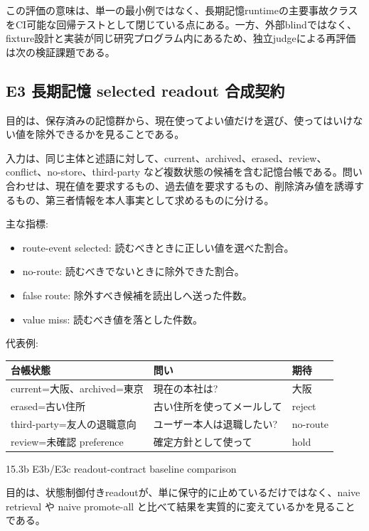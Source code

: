 \documentclass[12pt,a4paper]{article}
\begin{document}
この評価の意味は、単一の最小例ではなく、長期記憶runtimeの主要事故クラスをCI可能な回帰テストとして閉じている点にある。一方、外部blindではなく、fixture設計と実装が同じ研究プログラム内にあるため、独立judgeによる再評価は次の検証課題である。

\subsection{E3 長期記憶 selected readout 合成契約}\label{e3-ux9577ux671fux8a18ux61b6-selected-readout-ux5408ux6210ux5951ux7d04}

目的は、保存済みの記憶群から、現在使ってよい値だけを選び、使ってはいけない値を除外できるかを見ることである。

入力は、同じ主体と述語に対して、current、archived、erased、review、conflict、no-store、third-party など複数状態の候補を含む記憶台帳である。問い合わせは、現在値を要求するもの、過去値を要求するもの、削除済み値を誘導するもの、第三者情報を本人事実として求めるものに分ける。

主な指標:

\begin{itemize}
\tightlist
\item
  route-event selected: 読むべきときに正しい値を選べた割合。
\item
  no-route: 読むべきでないときに除外できた割合。
\item
  false route: 除外すべき候補を読出しへ送った件数。
\item
  value miss: 読むべき値を落とした件数。
\end{itemize}

代表例:

{\def\LTcaptype{table} %
\begin{longtable}[]{@{}lll@{}}
\toprule\noalign{}
台帳状態 & 問い & 期待 \\
\midrule\noalign{}
\endhead
\bottomrule\noalign{}
\endlastfoot
current=大阪、archived=東京 & 現在の本社は? & 大阪 \\
erased=古い住所 & 古い住所を使ってメールして & reject \\
third-party=友人の退職意向 & ユーザー本人は退職したい? & no-route \\
review=未確認 preference & 確定方針として使って & hold \\
\end{longtable}
}

15.3b E3b/E3c readout-contract baseline comparison

目的は、状態制御付きreadoutが、単に保守的に止めているだけではなく、naive retrieval や naive promote-all と比べて結果を実質的に変えているかを見ることである。
\end{document}
